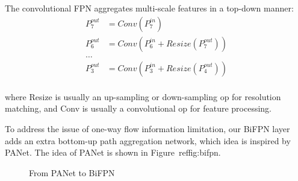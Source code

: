 \documentclass[journal,conference]{IEEEtran}
\begin{document}
The convolutional FPN aggregates multi-scale features in a top-down manner:
\begin{align*}
  P_7^{out} & =Conv(P_7^{in})                   \\
  P_6^{out} & =Conv(P_6^{in}+Resize(P_7^{out})) \\
  \ldots    &                                   \\
  P_3^{out} & =Conv(P_3^{in}+Resize(P_4^{out})) \\
\end{align*}

where Resize is usually an up-sampling or down-sampling op for resolution matching, and Conv is usually a convolutional op for feature processing.

To address the issue of one-way flow information limitation, our BiFPN layer adds an extra bottom-up path aggregation network, which idea is inspired by PANet. The idea of PANet is shown in Figure~ref{fig:bifpn}.

\begin{figure}[htbp]
  \centering
  \caption{From PANet to BiFPN}\label{fig:bifpn}
\end{figure}
\end{document}
